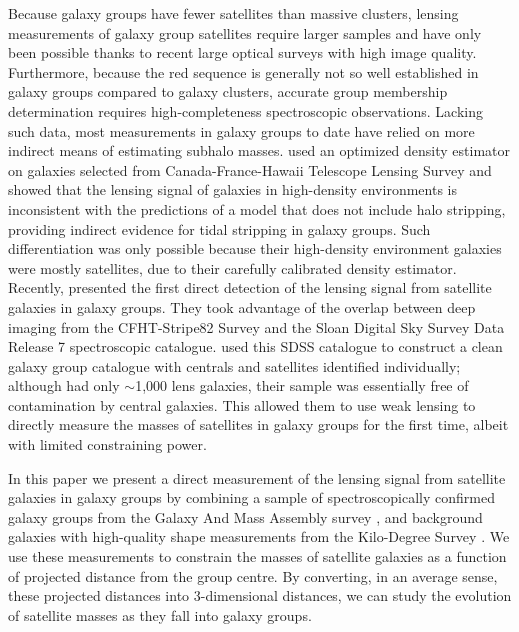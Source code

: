 Because galaxy groups have fewer satellites than massive clusters, lensing measurements of galaxy 
group satellites require larger samples and have only been possible thanks to recent large optical 
surveys with high image quality. Furthermore, because the red sequence is generally not so well 
established in galaxy groups compared to galaxy clusters, accurate group membership determination 
requires high-completeness spectroscopic observations. Lacking such data, most measurements in 
galaxy groups to date have relied on more indirect means of estimating subhalo masses. 
\cite{gillis13} used an optimized density estimator on galaxies selected from Canada-France-Hawaii 
Telescope Lensing Survey \citep[CFHTLenS,][]{heymans12,erben13} and showed that the lensing signal 
of galaxies in high-density environments is inconsistent with the predictions of a model that does 
not include halo stripping, providing indirect evidence for tidal stripping in galaxy groups. Such 
differentiation was only possible because their high-density environment galaxies were mostly 
satellites, due to their carefully calibrated density estimator. Recently, \cite{li14} presented the 
first direct detection of the lensing signal from satellite galaxies in galaxy groups. They took 
advantage of the overlap between deep imaging from the CFHT-Stripe82 Survey \citep[CS82, 
e.g.,][]{comparat13} and the Sloan Digital Sky Survey \citep[SDSS,][]{york00} Data Release 7 
\citep{sdss7} spectroscopic catalogue. \cite{yang07} used this SDSS catalogue to construct a 
clean galaxy group catalogue with centrals and satellites identified individually; although 
\cite{li14} had only $\sim$1,000 lens galaxies, their sample was essentially free of contamination 
by central galaxies. This allowed them to use weak lensing to directly measure the masses of 
satellites in galaxy groups for the first time, albeit with limited constraining power.

In this paper we present a direct measurement of the lensing signal from satellite galaxies in 
galaxy groups by combining a sample of spectroscopically confirmed galaxy groups from the Galaxy 
And Mass Assembly survey \citep[GAMA,][]{driver11}, and background galaxies with high-quality shape 
measurements from the Kilo-Degree Survey \citep[KiDS,][]{dejong13,kuijken15}. We use these 
measurements to constrain the masses of satellite galaxies as a function of projected distance from 
the group centre. By converting, in an average sense, these projected distances into 3-dimensional 
distances, we can study the evolution of satellite masses as they fall into galaxy groups.

